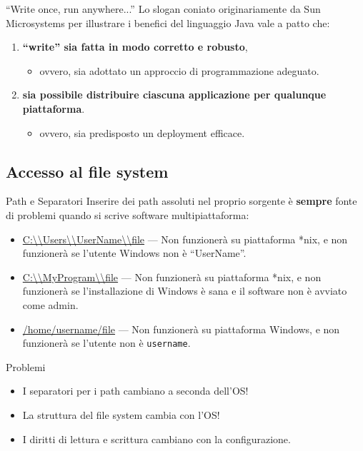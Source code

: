 \documentclass[presentation]{beamer}
\begin{document}
\begin{frame}{``Write once, run anywhere...''}
	Lo slogan coniato originariamente da Sun Microsystems per illustrare i benefici del linguaggio Java vale a patto che:
	\begin{enumerate}\itemsep10pt
		\item \textbf{``write'' sia fatta in modo corretto e robusto},
		\begin{itemize}
			\item ovvero, sia adottato un approccio di programmazione adeguato.
		\end{itemize}
			\item \textbf{sia possibile distribuire ciascuna applicazione per qualunque piattaforma}.
		\begin{itemize}
			\item ovvero, sia predisposto un deployment efficace. 
		\end{itemize}
	\end{enumerate}
\end{frame}

\subsection{Accesso al file system}

\begin{frame}{Path e Separatori}
	Inserire dei path assoluti nel proprio sorgente è \textbf{sempre} fonte di problemi quando si scrive software multipiattaforma:
	\begin{itemize}
		\item \url{C:\\Users\\UserName\\file} --- Non funzionerà su piattaforma *nix, e non funzionerà se l'utente Windows non è ``UserName''.
		\item \url{C:\\MyProgram\\file} --- Non funzionerà su piattaforma *nix, e non funzionerà se l'installazione di Windows è sana e il software non è avviato come admin.
		\item \url{/home/username/file} --- Non funzionerà su piattaforma Windows, e non funzionerà se l'utente non è \texttt{username}.
	\end{itemize}
	\begin{block}{Problemi}
		\begin{itemize}
			\item I separatori per i path cambiano a seconda dell'OS!
			\item La struttura del file system cambia con l'OS!
			\item I diritti di lettura e scrittura cambiano con la configurazione.
		\end{itemize}
		\end{block}
\end{frame}
\end{document}
